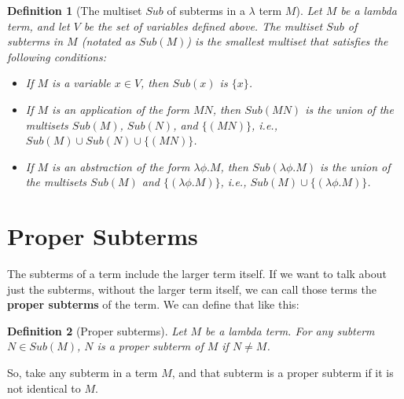 \documentclass{book}
\numberwithin{equation}{chapter}
\newcommand{\vocab}{\textbf}
\newtheorem{definition}{Definition}
\begin{document}
\begin{definition}[The multiset $Sub$ of subterms in a $\lambda$ term $M$]
Let $M$ be a lambda term, and let $V$ be the set of variables defined above. The multiset $Sub$ of subterms in $M$ (notated as $Sub(M)$) is the smallest multiset that satisfies the following conditions:

\begin{itemize}
\item{If $M$ is a variable $x \in V$, then $Sub(x)$ is $\{ x \}$.}
\item{If $M$ is an application of the form $M N$, then $Sub(M N)$ is the union of the multisets $Sub(M)$, $Sub(N)$, and $\{ (M N) \}$, i.e., $Sub(M) \cup Sub(N) \cup \{(M N)\}$.}
\item{If $M$ is an abstraction of the form $\lambda \phi.M$, then $Sub(\lambda \phi.M)$ is the union of the multisets $Sub(M)$ and $\{ (\lambda \phi.M) \}$, i.e., $Sub(M) \cup \{ (\lambda \phi.M) \}$.}
\end{itemize}

\end{definition}


\section{Proper Subterms}

The subterms of a term include the larger term itself. If we want to talk about just the subterms, without the larger term itself, we can call those terms the \vocab{proper subterms} of the term. We can define that like this:

\begin{definition}[Proper subterms]
Let $M$ be a lambda term. For any subterm $N \in Sub(M)$, $N$ is a proper subterm of $M$ if $N \not = M$. 
\end{definition}

\noindent
So, take any subterm in a term $M$, and that subterm is a proper subterm if it is not identical to $M$. 


\end{document}
